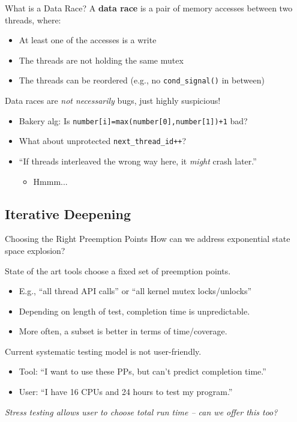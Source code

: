 \documentclass[xcolor=dvipsnames]{beamer}
\begin{document}
\begin{frame}{What is a Data Race?}
	A {\bf data race} is a pair of memory accesses between two threads, where:
	\begin{itemize}
		\item At least one of the accesses is a write
		\item The threads are not holding the same mutex
		\item The threads can be reordered (e.g., no \texttt{cond\_signal()} in between)
	\end{itemize}
	\pause
	\linegap

	Data races are {\em not necessarily} bugs, just highly suspicious!
	\begin{itemize}
		\item Bakery alg: Is {\tt number[i]=max(number[0],number[1])+1} bad?
		\item What about unprotected {\tt next\_thread\_id++}?
		\item ``If threads interleaved the wrong way here, it {\em might} crash later.''
		\begin{itemize}
			\item Hmmm...
		\end{itemize}
	\end{itemize}
\end{frame}


\subsection{Iterative Deepening}

\begin{frame}{Choosing the Right Preemption Points}
	How can we address exponential state space explosion?
	\pause
	\linegap

	State of the art tools choose a fixed set of preemption points.
	\begin{itemize}
		\item E.g., ``all thread API calls'' or ``all kernel mutex locks/unlocks''
		\item Depending on length of test, completion time is unpredictable.
		\item More often, a subset is better in terms of time/coverage. 
	\end{itemize}
	\pause
	\linegap
	Current systematic testing model is not user-friendly.
	\begin{itemize}
		\item Tool: ``I want to use these PPs, but can't predict completion time.''
		\item User: ``I have 16 CPUs and 24 hours to test my program.''
	\end{itemize}
	\linegap
	{\em Stress testing allows user to choose total run time -- can we offer this too?}
\end{frame}
\end{document}
